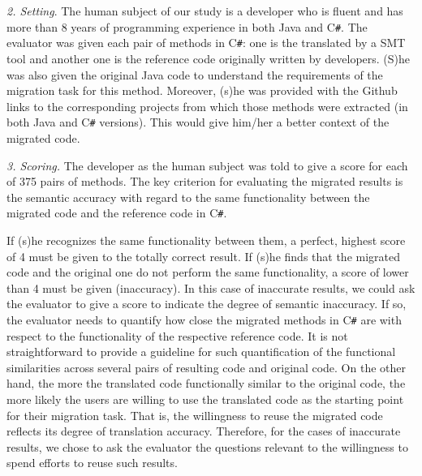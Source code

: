 
\emph{2. Setting}. The human subject of our study is a developer who
is fluent and has more than 8 years of programming experience in both
Java and C\texttt{\#}. The evaluator was given each pair of methods in
C\texttt{\#}: one is the translated by a SMT tool and another one is
the reference code originally written by developers.
%
(S)he was also given the original Java code to understand the
requirements of the migration task for this method. Moreover, (s)he
was provided with the Github links to the corresponding projects from
which those methods were extracted (in both Java and C\texttt{\#}
versions). This would give him/her a better context of the migrated
code.

\emph{3. Scoring.} The developer as the human subject was told to give
a score for each of 375 pairs of methods. The key criterion for
evaluating the migrated results is the semantic accuracy with regard
to the same functionality between the migrated code and the reference
code in C\texttt{\#}.

If (s)he recognizes the same functionality between them, a perfect,
highest score of 4 must be given to the totally correct result. If
(s)he finds that the migrated code and the original one do not perform
the same functionality, a score of lower than 4 must be given
(inaccuracy). In this case of inaccurate results, we could ask the
evaluator to give a score to indicate the degree of semantic
inaccuracy. If so, the evaluator needs to quantify how close the
migrated methods in C\texttt{\#} are with respect to the functionality
of the respective reference code.
It is not straightforward to provide a guideline for such
quantification of the functional similarities across several pairs of
resulting code and original code.
%
On the other hand, the more the translated code functionally similar
to the original code, the more likely the users are willing to use the
translated code as the starting point for their migration task. That
is, the willingness to reuse the migrated code reflects its degree of
translation accuracy.
%
%
Therefore, for the cases of inaccurate results, we chose to ask the
evaluator the questions relevant to the willingness to spend efforts
to reuse such results.

